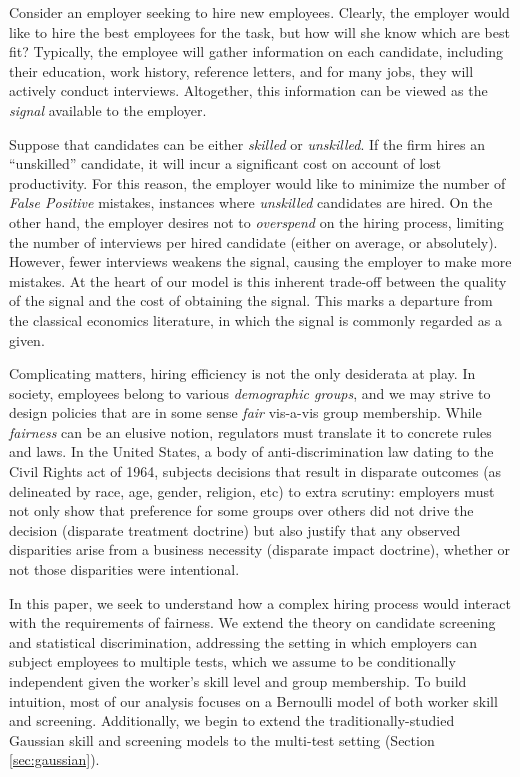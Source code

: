 Consider an employer seeking to hire new employees. 
Clearly, the employer would like to hire the best employees for the task, 
but how will she know which are best fit? 
Typically, the employee will gather information on each candidate,
including their education, work history, reference letters, 
and for many jobs, they will actively conduct interviews. 
Altogether, this information can be viewed as the \emph{signal} available to the employer.


Suppose that candidates can be either \emph{skilled} or \emph{unskilled}. 
If the firm hires an ``unskilled'' candidate, 
it will incur a significant cost on account of lost productivity.
For this reason, the employer would like 
to minimize the number of \emph{False Positive} mistakes, 
instances where \emph{unskilled} candidates are hired. 
On the other hand, the employer desires 
not to \emph{overspend} on the hiring process, 
limiting the number of interviews per hired candidate 
(either on average, or absolutely).
However, fewer interviews weakens the signal, 
causing the employer to make more mistakes.
%
At the heart of our model is this inherent trade-off 
between the quality of the signal 
and the cost of obtaining the signal.
This marks a departure from the classical economics literature,
in which the signal is commonly regarded as a given.


Complicating matters, hiring efficiency is not the only desiderata at play. 
In society, employees belong to various \emph{demographic groups}, 
and we may strive to design policies 
that are in some sense \emph{fair} vis-a-vis group membership. 
While \emph{fairness} can be an elusive notion, 
regulators must translate it to concrete rules and laws.
In the United States, a body of anti-discrimination law
dating to the Civil Rights act of 1964, 
subjects decisions that result in disparate outcomes 
(as delineated by race, age, gender, religion, etc)
to extra scrutiny: employers must not only show 
that preference for some groups over others 
did not drive the decision (disparate treatment doctrine) 
but also justify that any observed disparities 
arise from a business necessity (disparate impact doctrine), 
whether or not those disparities were intentional.


In this paper, we seek to understand how a complex hiring process 
would interact with the requirements of fairness.  
We extend the theory on candidate screening and statistical discrimination,
addressing the setting in which employers can subject 
employees to multiple tests,
which we assume to be conditionally independent
given the worker's skill level and group membership.
To build intuition, most of our analysis focuses 
on a Bernoulli model of both worker skill and screening.
Additionally, we begin to extend the traditionally-studied 
Gaussian skill and screening models to the multi-test setting (Section \ref{sec:gaussian}). 


